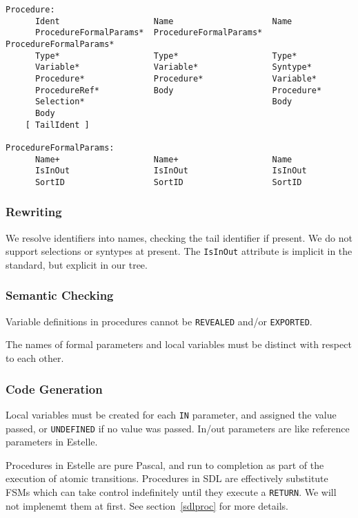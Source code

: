 \begin{verbatim}
Procedure:
      Ident                   Name                    Name
      ProcedureFormalParams*  ProcedureFormalParams*  ProcedureFormalParams*
      Type*                   Type*                   Type*
      Variable*               Variable*               Syntype*
      Procedure*              Procedure*              Variable*
      ProcedureRef*           Body                    Procedure*
      Selection*                                      Body
      Body
    [ TailIdent ]

ProcedureFormalParams:
      Name+                   Name+                   Name
      IsInOut                 IsInOut                 IsInOut
      SortID                  SortID                  SortID
\end{verbatim}

\subsubsection{Rewriting}

We resolve identifiers into names, checking the tail identifier if
present. 
We do not support selections or syntypes at present.
The {\tt IsInOut} attribute is implicit in the standard, but explicit 
in our tree.

\subsubsection{Semantic Checking}

Variable definitions in procedures cannot be {\tt REVEALED}
and/or {\tt EXPORTED}. 

The names of formal parameters and local variables must be distinct
with respect to each other.

\subsubsection{Code Generation}

Local variables must be created for each {\tt IN} parameter, and assigned
the value passed, or {\tt UNDEFINED} if no value was passed. 
In/out parameters are like reference parameters in Estelle.

Procedures in Estelle are pure Pascal, and run to completion as part
of the execution of atomic transitions.
Procedures in SDL are
effectively substitute FSMs which can take control indefinitely 
until they execute a {\tt RETURN}.
We will not implenemt them at first. See section~\ref{sdlproc}
for more details.

